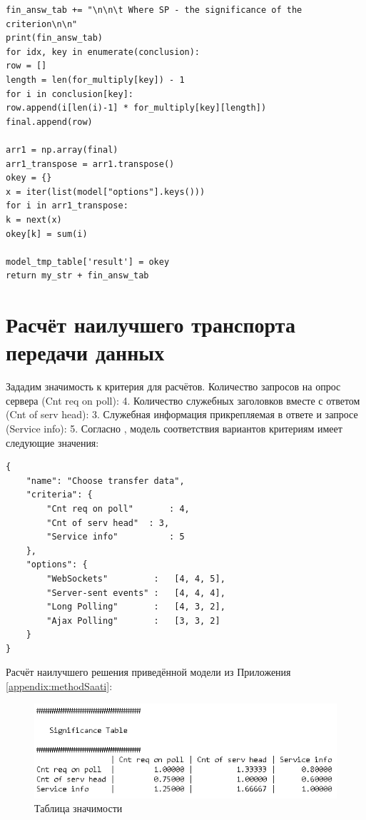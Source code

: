 \begin{lstlisting}[breaklines]
fin_answ_tab += "\n\n\t Where SP - the significance of the criterion\n\n"
print(fin_answ_tab)
for idx, key in enumerate(conclusion):
row = []
length = len(for_multiply[key]) - 1
for i in conclusion[key]:
row.append(i[len(i)-1] * for_multiply[key][length])
final.append(row)

arr1 = np.array(final)
arr1_transpose = arr1.transpose()
okey = {}
x = iter(list(model["options"].keys()))
for i in arr1_transpose:
k = next(x)
okey[k] = sum(i)

model_tmp_table['result'] = okey
return my_str + fin_answ_tab
\end{lstlisting}

\chapter{Расчёт наилучшего транспорта передачи данных} \label{appendix:calculBestTransferDataWay}

Зададим значимость к критерия для расчётов. Количество запросов  на опрос сервера (Cnt req on poll): 4. Количество служебных заголовков вместе с ответом (Cnt of serv head): 3. Служебная информация прикрепляемая в ответе и запросе (Service info): 5. Согласно , модель соответствия вариантов критериям имеет следующие значения:

\begin{lstlisting}
{
	"name": "Choose transfer data",
	"criteria": { 
		"Cnt req on poll"		: 4,
		"Cnt of serv head"	: 3,
		"Service info"			: 5
	},
	"options": {
		"WebSockets"         :   [4, 4, 5],
		"Server-sent events" :   [4, 4, 4],
		"Long Polling"       :   [4, 3, 2],
		"Ajax Polling"       :   [3, 3, 2]
	} 
}
\end{lstlisting}

Расчёт наилучшего решения приведённой модели из Приложения \ref{appendix:methodSaati}:

\begin{figure}
	\centering
	\includegraphics[width=1\linewidth]{my_folder/images/ATransferData1}
	\caption{Таблица значимости}
	\label{fig:atransferdata1}
\end{figure}

